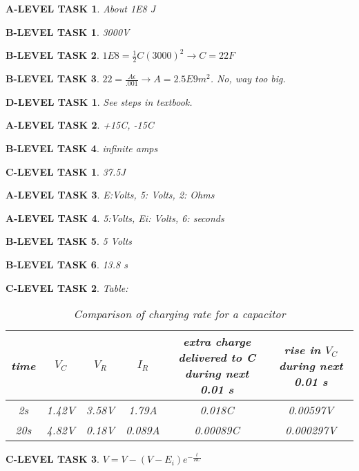 \documentclass{book}
\numberwithin{equation}{section}
\newtheorem{alevel}{A-LEVEL TASK}
\newtheorem{blevel}{B-LEVEL TASK}
\newtheorem{clevel}{C-LEVEL TASK}
\newtheorem{dlevel}{D-LEVEL TASK}
\theoremstyle{definition}
\begin{document}
\begin{alevel}About 1E8 J\end{alevel}
\begin{blevel}3000V\end{blevel}
\begin{blevel}$1E8=\frac{1}{2}C(3000)^2 \rightarrow C=22F$\end{blevel}
\begin{blevel}$22=\frac{A\epsilon}{.001} \rightarrow A=2.5E9 m^2$. No, way too big.\end{blevel}
\begin{dlevel}See steps in textbook.\end{dlevel}


\begin{alevel}+15C, -15C\end{alevel}
\begin{blevel}infinite amps\end{blevel}
\begin{clevel}37.5J\end{clevel}

\begin{alevel}E:Volts, 5: Volts, 2: Ohms\end{alevel}
\begin{alevel}5:Volts, Ei: Volts, 6: seconds\end{alevel}
\begin{blevel}5 Volts\end{blevel}
\begin{blevel}13.8 s\end{blevel}

\begin{clevel} Table:\par
\begin{table}[H]
\begin{center}
\begin{tabular}{|c|c|c|c|c|c|} \hline
time&$V_C$&$V_R$&$I_R$&extra charge delivered to C during next 0.01 s&rise in $V_C$ during next 0.01 s \\ \hline
2s&1.42V&3.58V&1.79A&0.018C&0.00597V \\ \hline
20s&4.82V&0.18V&0.089A&0.00089C&0.000297V \\ \hline
\end{tabular}
\caption{Comparison of charging rate for a capacitor}
\end{center}
\end{table}
\end{clevel}

\begin{clevel}$V=V-(V-E_i)e^{-\frac{t}{RC}}$ \end{clevel}
\end{document}
